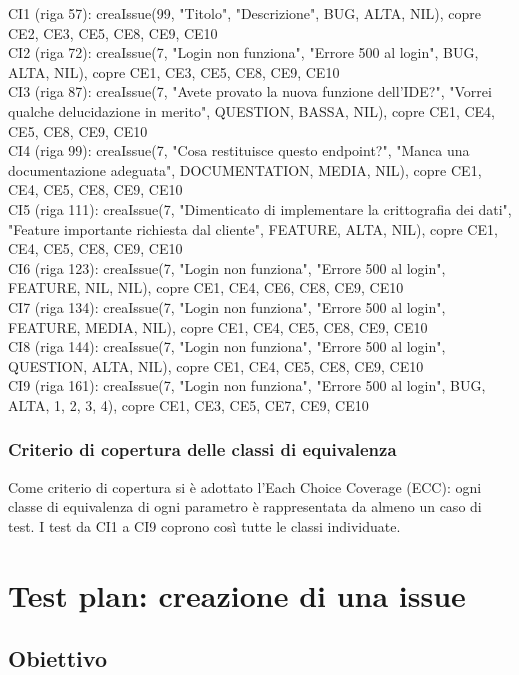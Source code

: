 \noindent CI1 (riga 57): creaIssue(99, "Titolo", "Descrizione", BUG, ALTA, NIL), copre CE2, CE3, CE5, CE8, CE9, CE10 \\
CI2 (riga 72): creaIssue(7, "Login non funziona", "Errore 500 al login", BUG, ALTA, NIL), copre CE1, CE3, CE5, CE8, CE9, CE10 \\
CI3 (riga 87): creaIssue(7, "Avete provato la nuova funzione dell'IDE?", "Vorrei qualche delucidazione in merito", QUESTION, BASSA, NIL), copre CE1, CE4, CE5, CE8, CE9, CE10 \\
CI4 (riga 99): creaIssue(7, "Cosa restituisce questo endpoint?", "Manca una documentazione adeguata", DOCUMENTATION, MEDIA, NIL), copre CE1, CE4, CE5, CE8, CE9, CE10 \\
CI5 (riga 111): creaIssue(7, "Dimenticato di implementare la crittografia dei dati", "Feature importante richiesta dal cliente", FEATURE, ALTA, NIL), copre CE1, CE4, CE5, CE8, CE9, CE10 \\
CI6 (riga 123): creaIssue(7, "Login non funziona", "Errore 500 al login", FEATURE, NIL, NIL), copre CE1, CE4, CE6, CE8, CE9, CE10 \\
CI7 (riga 134): creaIssue(7, "Login non funziona", "Errore 500 al login", FEATURE, MEDIA, NIL), copre CE1, CE4, CE5, CE8, CE9, CE10 \\
CI8 (riga 144): creaIssue(7, "Login non funziona", "Errore 500 al login", QUESTION, ALTA, NIL), copre CE1, CE4, CE5, CE8, CE9, CE10 \\
CI9 (riga 161): creaIssue(7, "Login non funziona", "Errore 500 al login", BUG, ALTA, {1, 2, 3, 4}), copre CE1, CE3, CE5, CE7, CE9, CE10 \\

\subsubsection{Criterio di copertura delle classi di equivalenza}
Come criterio di copertura si è adottato l'Each Choice Coverage (ECC): ogni 
classe di equivalenza di ogni parametro è rappresentata da almeno un caso di 
test. I test da CI1 a CI9 coprono così tutte le classi individuate.

\section{Test plan: creazione di una issue}

\subsection{Obiettivo} 

